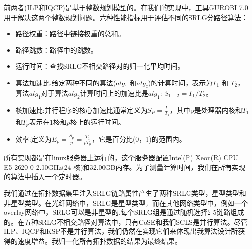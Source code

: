 前两者(ILP和IQCP)是基于整数规划模型的。在我们的实现中，工具GUROBI 7.0\cite{optimization2012gurobi}用于解决这两个整数规划问题。六种性能指标用于评估不同的SRLG分路径算法：
\begin{itemize}
  \item 路径权重：路径中链接权重的总和。
  \item 路径跳数：路径中的跳数。
  \item 运行时间：查找SRLG不相交路径对的归一化平均时间。
  \item 算法加速比:给定两种不同的算法($alg_1$ 和$alg_2$)的计算时间，表示为$T_1$ 和 $T_2$，算法$alg_1$对于算法$alg_2$计算时间上的加速比是$alg_1$: ${S_{1 - 2}} = T_1/T_2$。
  \item 核加速比:并行程序的核心加速比\cite{grama2003introduction}通常定义为$S_P=\frac{T_1}{T_p}$，其中p是处理器内核和$T_1$和$T_p$表示在1核和$p$核上的运行时间。
  \item 效率\cite{grama2003introduction}:定义为$E_p=\frac{S_p}{p}=\frac{T_1}{pT_p}$，它是百分比(0，1)的范围内。


\end{itemize}


所有实现都是在linux服务器上运行的，这个服务器配置Intel(R) Xeon(R) CPU E5-2620 0 \@ 2.00GHz(24 核)和32.00GB内存。为了测量计算时间，我们在所有实现的算法中插入一个定时器。

我们通过在拓扑数据集里注入SRLG链路属性产生了两种SRLG类型，星型类型和非星型类型。在光纤网络中，SRLG是星型类型，而在其他网络类型中，例如一个overlay网络中，SRLG可以是非星型的.每个SRLG组是通过随机选择2-5链路组成的。在五种SRLG不相交路径对算法中，只有CoSE和我们SCLS是并行算法。尽管ILP、IQCP和KSP不是并行算法，我们仍然在实现它们来体现出我算法设计所获得的速度增益。我归一化\cite{tax2000feature}所有拓扑数据的结果为最终结果。


